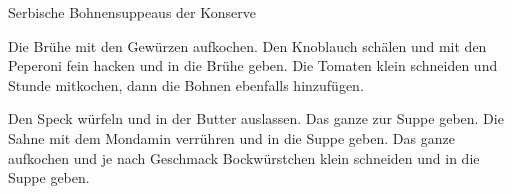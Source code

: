 \begin{recipe}{Serbische Bohnensuppe}{aus der Konserve}
  \inglist
  
  \steps
  Die Brühe mit den Gewürzen aufkochen. Den Knoblauch schälen und mit den Peperoni fein hacken und in die Brühe geben. Die Tomaten klein schneiden und \halb Stunde mitkochen, dann die Bohnen ebenfalls hinzufügen.

  Den Speck würfeln und in der Butter auslassen. Das ganze zur Suppe geben. Die Sahne mit dem Mondamin verrühren und in die Suppe geben. Das ganze aufkochen und je nach Geschmack Bockwürstchen klein schneiden und in die Suppe geben.
\end{recipe}
